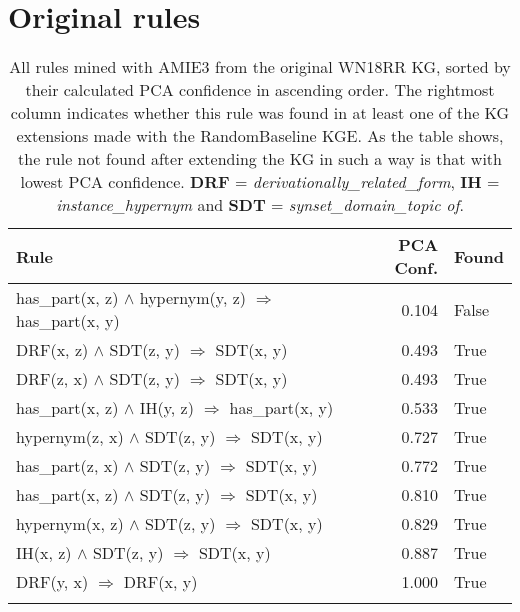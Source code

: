 \chapter{Original rules}
\begin{longtable}{lrl}
\toprule
                                                                                                      Rule &  PCA Conf. &  Found \\
\midrule
                                               has\_part(x, z) $\wedge$ hypernym(y, z)   $\Rightarrow$ has\_part(x, y) &           0.104 &                    False \\
DRF(x, z) $\wedge$ SDT(z, y)   $\Rightarrow$ SDT(x, y) &           0.493 &                     True \\
DRF(z, x) $\wedge$ SDT(z, y)   $\Rightarrow$ SDT(x, y) &           0.493 &                     True \\
                                      has\_part(x, z) $\wedge$ IH(y, z)   $\Rightarrow$ has\_part(x, y) &           0.533 &                     True \\
                   hypernym(z, x) $\wedge$ SDT(z, y)   $\Rightarrow$ SDT(x, y) &           0.727 &                     True \\
                   has\_part(z, x) $\wedge$ SDT(z, y)   $\Rightarrow$ SDT(x, y) &           0.772 &                     True \\
                   has\_part(x, z) $\wedge$ SDT(z, y)   $\Rightarrow$ SDT(x, y) &           0.810 &                     True \\
                   hypernym(x, z) $\wedge$ SDT(z, y)   $\Rightarrow$ SDT(x, y) &           0.829 &                     True \\
          IH(x, z) $\wedge$ SDT(z, y)   $\Rightarrow$ SDT(x, y) &           0.887 &                     True \\
                            DRF(y, x)   $\Rightarrow$ DRF(x, y) &           1.000 &                     True \\
\bottomrule
\caption[Original rules listed WN18RR KG]{All rules mined with AMIE3 from the original WN18RR KG, sorted by their calculated PCA confidence in ascending order. The rightmost column indicates whether this rule was found in at least one of the KG extensions made with the RandomBaseline KGE. As the table shows, the rule not found after extending the KG in such a way is that with lowest PCA confidence. \textbf{DRF} = \textit{derivationally\_related\_form}, \textbf{IH} = \textit{instance\_hypernym} and \textbf{SDT} = \textit{synset\_domain\_topic of}.}
\label{original_rules_found_by_baseline_WN18RR}
\end{longtable}

